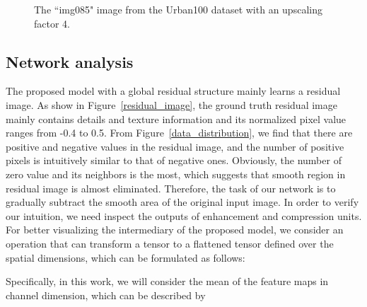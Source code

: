 \documentclass[10pt,twocolumn,letterpaper]{article}
\begin{document}
\begin{figure*}[htb]
	\centering
	\caption{The ``img085" image from the Urban100 dataset with an upscaling factor 4.}
	\label{fig:img085}
\end{figure*}

\subsection{Network analysis}
The proposed model with a global residual structure mainly learns a residual image. As show in Figure~\ref{residual_image}, the ground truth residual image mainly contains details and texture information and its normalized pixel value ranges from -0.4 to 0.5. From Figure~\ref{data_distribution}, we find that there are positive and negative values in the residual image, and the number of positive pixels is intuitively similar to that of negative ones. Obviously, the number of zero value and its neighbors is the most, which suggests that smooth region in residual image is almost eliminated. Therefore, the task of our network is to gradually subtract the smooth area of the original input image. In order to verify our intuition, we need inspect the outputs of enhancement and compression units. For better visualizing the intermediary of the proposed model, we consider an operation  that can transform a  tensor  to a flattened  tensor defined over the spatial dimensions, which can be formulated as follows:

Specifically, in this work, we will consider the mean of the feature maps in channel dimension, which can be described by
\end{document}

